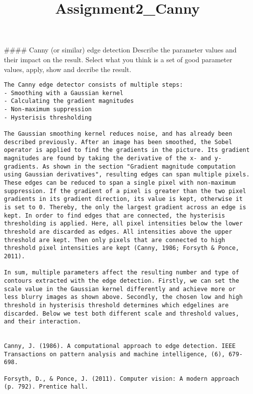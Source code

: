 \documentclass[11pt]{article}
\title{Assignment2\_Canny}
\begin{document}
    
    \maketitle
    
    

    
    \#\#\#\# Canny (or similar) edge detection Describe the parameter values
and their impact on the result. Select what you think is a set of good
parameter values, apply, show and decribe the result.

    \begin{verbatim}
The Canny edge detector consists of multiple steps: 
- Smoothing with a Gaussian kernel
- Calculating the gradient magnitudes
- Non-maximum suppression 
- Hysterisis thresholding 

The Gaussian smoothing kernel reduces noise, and has already been described previously. After an image has been smoothed, the Sobel operator is applied to find the gradients in the picture. Its gradient magnitudes are found by taking the derivative of the x- and y-gradients. As shown in the section "Gradient magnitude computation using Gaussian derivatives", resulting edges can span multiple pixels. These edges can be reduced to span a single pixel with non-maximum suppression. If the gradient of a pixel is greater than the two pixel gradients in its gradient direction, its value is kept, otherwise it is set to 0. Thereby, the only the largest gradient across an edge is kept. In order to find edges that are connected, the hysterisis thresholding is applied. Here, all pixel intensities below the lower threshold are discarded as edges. All intensities above the upper threshold are kept. Then only pixels that are connected to high threshold pixel intensities are kept (Canny, 1986; Forsyth & Ponce, 2011). 

In sum, multiple parameters affect the resulting number and type of contours extracted with the edge detection. Firstly, we can set the scale value in the Gaussian kernel differently and achieve more or less blurry images as shown above. Secondly, the chosen low and high threshold in hysterisis threshold determines which edgelines are discarded. Below we test both different scale and threshold values, and their interaction. 


Canny, J. (1986). A computational approach to edge detection. IEEE Transactions on pattern analysis and machine intelligence, (6), 679-698.

Forsyth, D., & Ponce, J. (2011). Computer vision: A modern approach (p. 792). Prentice hall.
\end{verbatim}
\end{document}
